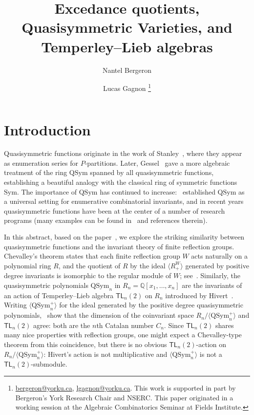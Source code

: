 \documentclass[submission]{FPSAC2024}
\title[Excedance quotients, Quasisymmetric Varieties, and $\mathsf{TL}_{n}(2)$]{Excedance quotients, Quasisymmetric Varieties, and Temperley--Lieb algebras}
\author{Nantel Bergeron \and Lucas Gagnon
\thanks{\href{mailto:bergeron@yorku.ca}{bergeron@yorku.ca}, \href{mailto:lgagnon@yorku.ca}{lgagnon@yorku.ca}. This work is supported in part by Bergeron's York Research Chair and NSERC. This paper originated in a working session at the Algebraic Combinatorics Seminar at Fields Institute.}\addressmark{1}}
\theoremstyle{definition}
\theoremstyle{remark}
\numberwithin{equation}{section}
\newcommand{\QQ}{\mathbb{Q}}
\newcommand{\TL}{\mathsf{TL}}
\newcommand{\Sym}{\mathrm{Sym}}
\newcommand{\QSym}{\mathrm{QSym}}
\begin{document}
\maketitle


\section{Introduction}

Quasisymmetric functions originate in the work of Stanley~\cite{S72}, where they appear as enumeration series for $P$-partitions.  
Later, Gessel~\cite{Gessel} gave a more algebraic treatment of the ring $\QSym$ spanned by all quasisymmetric functions, establishing a beautiful analogy with the classical ring of symmetric functions $\Sym$. 
The importance of $\QSym$ has continued to increase:~\cite{ABS} established $\QSym$ as a universal setting for enumerative combinatorial invariants, and in recent years quasisymmetric functions have been at the center of a number of research programs (many examples can be found in~\cite{Grinberg,LMvW, Mason} and references therein).

In this abstract, based on the paper~\cite{BG}, we explore the striking similarity between quasisymmetric functions and the invariant theory of finite reflection groups.  
Chevalley's theorem states that each finite reflection group $W$ acts naturally on a polynomial ring $R$, and the quotient of $R$ by the ideal $\langle R_{+}^{W} \rangle$ generated by positive degree invariants is isomorphic to the regular module of $W$; see~\cite[Chapter 3]{Humphrey}.  
Similarly, the quasisymmetric polynomials $\QSym_{n}$ in $R_{n} = \QQ[x_{1}, \ldots, x_{n}]$ are the invariants of an action of  Temperley--Lieb algebra $\TL_{n}(2)$ on $R_{n}$  introduced by Hivert~\cite{Hivert}.  
Writing $\langle \QSym_{n}^{+} \rangle$
for the ideal generated by the positive degree quasisymmetric polynomials,~\cite{ABB, AB} show that the dimension of the coinvariant space $R_{n}\big/\langle \QSym_{n}^{+} \rangle$ and $\TL_{n}(2)$ agree: both are the $n$th Catalan number $C_{n}$.  
Since $\TL_{n}(2)$ shares many nice properties with reflection groups, one might expect a Chevalley-type theorem from this coincidence, but there is no obvious $\TL_{n}(2)$-action on $R_{n}\big/\langle \QSym_{n}^{+} \rangle$:  Hivert's action is not multiplicative and $\langle \QSym_{n}^{+} \rangle$ is not a $\TL_{n}(2)$-submodule.  
\end{document}
